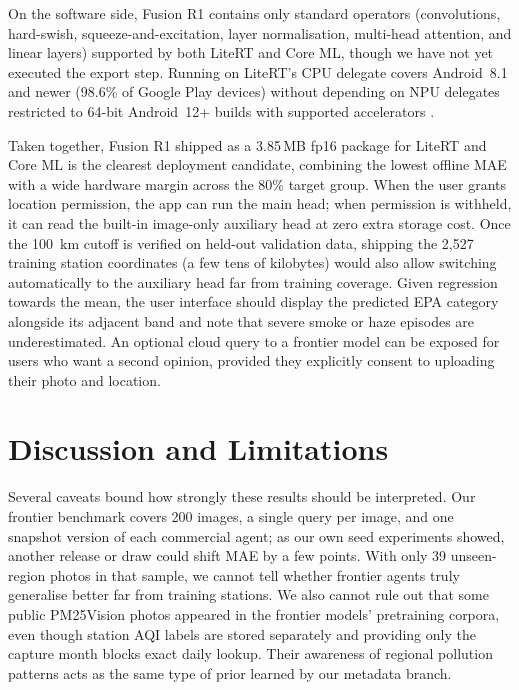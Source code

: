 \documentclass[conference]{IEEEtran}
\begin{document}
On the software side, Fusion R1 contains only standard operators (convolutions,
hard-swish, squeeze-and-excitation, layer normalisation, multi-head attention,
and linear layers) supported by both LiteRT and Core ML, though we have not yet
executed the export step. Running on LiteRT's CPU delegate covers Android~8.1
and newer (98.6\% of Google Play devices) without depending on NPU delegates
restricted to 64-bit Android~12+ builds with supported accelerators
\cite{litert2026}.

Taken together, Fusion R1 shipped as a 3.85\,MB fp16 package for LiteRT and Core
ML is the clearest deployment candidate, combining the lowest offline MAE with a
wide hardware margin across the 80\% target group. When the user grants location
permission, the app can run the main head; when permission is withheld, it can
read the built-in image-only auxiliary head at zero extra storage cost. Once the
100~km cutoff is verified on held-out validation data, shipping the 2,527
training station coordinates (a few tens of kilobytes) would also allow
switching automatically to the auxiliary head far from training coverage. Given
regression towards the mean, the user interface should display the predicted EPA
category alongside its adjacent band and note that severe smoke or haze episodes
are underestimated. An optional cloud query to a frontier model can be exposed
for users who want a second opinion, provided they explicitly consent to
uploading their photo and location.

\section{Discussion and Limitations}
\label{sec:discussion}

Several caveats bound how strongly these results should be interpreted. Our
frontier benchmark covers 200 images, a single query per image, and one snapshot
version of each commercial agent; as our own seed experiments showed, another
release or draw could shift MAE by a few points. With only 39 unseen-region
photos in that sample, we cannot tell whether frontier agents truly generalise
better far from training stations. We also cannot rule out that some public
PM25Vision photos appeared in the frontier models' pretraining corpora, even
though station AQI labels are stored separately and providing only the capture
month blocks exact daily lookup. Their awareness of regional pollution patterns
acts as the same type of prior learned by our metadata branch.
\end{document}
